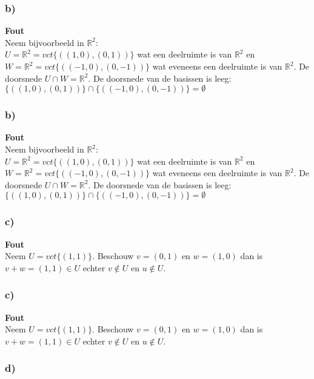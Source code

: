 \documentclass[lineaire_algebra_oplossingen.tex]{subfiles}
\begin{document}
\subsubsection*{b)}
\textbf{Fout}\\
Neem bijvoorbeeld in $\mathbb{R}^2$:\\
$U = \mathbb{R}^2 = vct\{((1,0),(0,1))\}$ wat een deelruimte is van $\mathbb{R}^2$ en
$W = \mathbb{R}^2  = vct\{((-1,0),(0,-1))\}$ wat eveneens een deelruimte is van $\mathbb{R}^2$. De doorsnede $U \cap W = \mathbb{R}^2 $. De doorsnede van de basissen is leeg: $\{((1,0),(0,1))\} \cap \{((-1,0),(0,-1))\} = \emptyset$

\subsubsection*{b)}
\textbf{Fout}\\
Neem bijvoorbeeld in $\mathbb{R}^2$:\\
$U = \mathbb{R}^2 = vct\{((1,0),(0,1))\}$ wat een deelruimte is van $\mathbb{R}^2$ en
$W = \mathbb{R}^2  = vct\{((-1,0),(0,-1))\}$ wat eveneens een deelruimte is van $\mathbb{R}^2$. De doorsnede $U \cap W = \mathbb{R}^2 $. De doorsnede van de basissen is leeg: $\{((1,0),(0,1))\} \cap \{((-1,0),(0,-1))\} = \emptyset$

\subsubsection*{c)}
\textbf{Fout}\\
Neem $U=vct\{(1,1)\}$. Beschouw $v=(0,1)$ en $w=(1,0)$ dan is $v+w = (1,1) \in U$ echter  $v \notin U$ en $u \notin U$.

\subsubsection*{c)}
\textbf{Fout}\\
Neem $U=vct\{(1,1)\}$. Beschouw $v=(0,1)$ en $w=(1,0)$ dan is $v+w = (1,1) \in U$ echter  $v \notin U$ en $u \notin U$.

\subsubsection*{d)}
\end{document}
